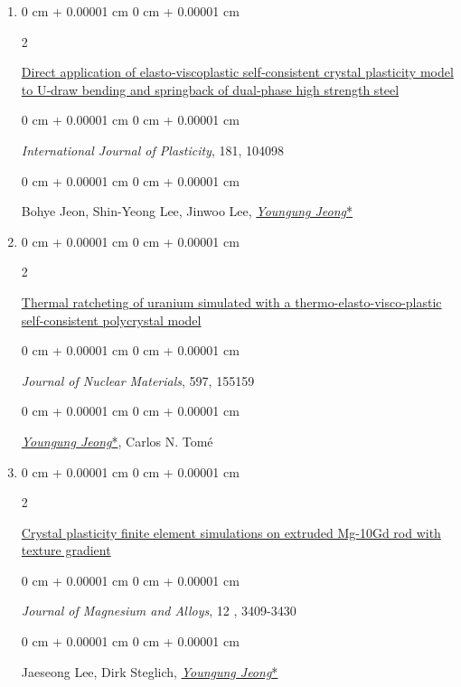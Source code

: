 \documentclass[10pt, letterpaper]{article}
\newenvironment{onecolentry}{
    \begin{adjustwidth}{
        0 cm + 0.00001 cm
    }{
        0 cm + 0.00001 cm
    }
}{
    \end{adjustwidth}
} %
\newenvironment{twocolentry}[2][]{
    \onecolentry
    \def\secondColumn{#2}
    \setcolumnwidth{\fill, 4.5 cm}
    \begin{paracol}{2}
}{
    \switchcolumn \raggedleft \secondColumn
    \end{paracol}
    \endonecolentry
} %
\begin{document}
\begin{enumerate}
        \item
        \begin{twocolentry}{2024}
            \href{https://doi.org/10.1016/j.ijplas.2024.104098}{Direct application of elasto‑viscoplastic self‑consistent crystal plasticity model to U‑draw bending and springback of dual‑phase high strength steel}
        \end{twocolentry}
        \begin{onecolentry}
            {\it International Journal of Plasticity}, 181, 104098
        \end{onecolentry}
        \begin{onecolentry}
            Bohye Jeon, Shin-Yeong Lee, Jinwoo Lee, {\underline{\textit{Youngung Jeong}*}}
        \end{onecolentry}
        \vspace{0.10 cm}

        \item
        \begin{twocolentry}{2024}
            \href{https://doi.org/10.1016/j.jnucmat.2024.155159}{Thermal ratcheting of uranium simulated with a thermo-elasto-visco-plastic self-consistent polycrystal model}
        \end{twocolentry}
        \begin{onecolentry}
            {\it Journal of Nuclear Materials}, 597, 155159
        \end{onecolentry}
        \begin{onecolentry}
            {\underline{\textit{Youngung Jeong}*}}, Carlos N. Tomé
        \end{onecolentry}
        \vspace{0.10 cm}

        \item
        \begin{twocolentry}{2024}
            \href{https://doi.org/10.1016/j.jma.2024.08.009}{Crystal plasticity finite element simulations on extruded Mg-10Gd rod with texture gradient}
        \end{twocolentry}
        \begin{onecolentry}
            {\it Journal of Magnesium and Alloys}, 12 , 3409-3430
        \end{onecolentry}
        \begin{onecolentry}
            Jaeseong Lee, Dirk Steglich, {\underline{\textit{Youngung Jeong}*}}
        \end{onecolentry}
        \vspace{0.10 cm}


\end{enumerate}
\end{document}
